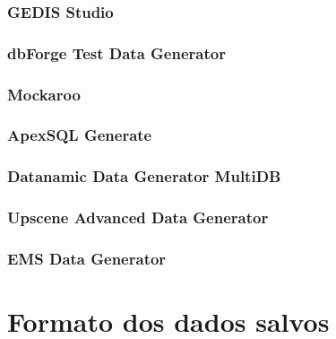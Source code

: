 \documentclass[
	12pt,				%
	openright,			%
	twoside,			%
	a4paper,			%
	english,			%
	brazil				%
	]{abntex2}
\begin{document}
	\subsubsection{GEDIS Studio}
	\subsubsection{dbForge Test Data Generator}
	\subsubsection{Mockaroo}
	\subsubsection{ApexSQL Generate}
	\subsubsection{Datanamic Data Generator MultiDB}
	\subsubsection{Upscene Advanced Data Generator}
	\subsubsection{EMS Data Generator}
	

	\section{Formato dos dados salvos}
\end{document}
